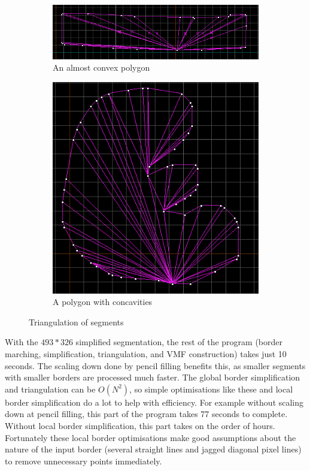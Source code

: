 \documentclass[11pt]{IEEEtran}
\begin{document}
\begin{figure}[h]
     \centering
     \begin{subfigure}[b]{0.45\textwidth}
         \centering
         \includegraphics[width=\textwidth]{tri1}
         \caption{An almost convex polygon}
         \label{fig:tri1}
     \end{subfigure}
     \hfill
     \begin{subfigure}[b]{0.45\textwidth}
         \centering
         \includegraphics[width=\textwidth]{tri2}
         \caption{A polygon with concavities}
         \label{fig:tri2}
     \end{subfigure}
        \caption{Triangulation of segments}
        \label{fig:tri}
\end{figure}

With the $493*326$ simplified segmentation, the rest of the program (border marching, simplification, triangulation, and VMF construction) takes just 10 seconds. The scaling down done by pencil filling benefits this, as smaller segments with smaller borders are processed much faster. The global border simplification and triangulation can be $O(N^2)$, so simple optimisations like these and local border simplification do a lot to help with efficiency. For example without scaling down at pencil filling, this part of the program takes 77 seconds to complete. Without local border simplification, this part takes on the order of hours. Fortunately these local border optimisations make good assumptions about the nature of the input border (several straight lines and jagged diagonal pixel lines) to remove unnecessary points immediately.
\end{document}
